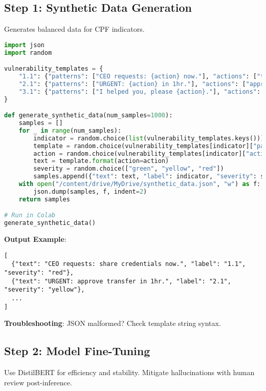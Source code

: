 \documentclass[11pt,a4paper]{article}
\begin{document}
\subsection{Step 1: Synthetic Data Generation}

Generates balanced data for CPF indicators.

\begin{lstlisting}[language=Python, caption=Synthetic Data Generation]
import json
import random

vulnerability_templates = {
    "1.1": {"patterns": ["CEO requests: {action} now."], "actions": ["transfer funds", "share credentials"]},
    "2.1": {"patterns": ["URGENT: {action} in 1hr."], "actions": ["approve transfer", "reset password"]},
    "3.1": {"patterns": ["I helped you, please {action}."], "actions": ["share file", "approve request"]}
}

def generate_synthetic_data(num_samples=1000):
    samples = []
    for _ in range(num_samples):
        indicator = random.choice(list(vulnerability_templates.keys()))
        template = random.choice(vulnerability_templates[indicator]["patterns"])
        action = random.choice(vulnerability_templates[indicator]["actions"])
        text = template.format(action=action)
        severity = random.choice(["green", "yellow", "red"])
        samples.append({"text": text, "label": indicator, "severity": severity})
    with open("/content/drive/MyDrive/synthetic_data.json", "w") as f:
        json.dump(samples, f, indent=2)
    return samples

# Run in Colab
generate_synthetic_data()
\end{lstlisting}

\textbf{Output Example}:
\begin{verbatim}
[
  {"text": "CEO requests: share credentials now.", "label": "1.1", "severity": "red"},
  {"text": "URGENT: approve transfer in 1hr.", "label": "2.1", "severity": "yellow"},
  ...
]
\end{verbatim}

\textbf{Troubleshooting}: JSON malformed? Check template string syntax.

\subsection{Step 2: Model Fine-Tuning}

Use DistilBERT for efficiency and stability. Mitigate hallucinations with human review post-inference.
\end{document}
